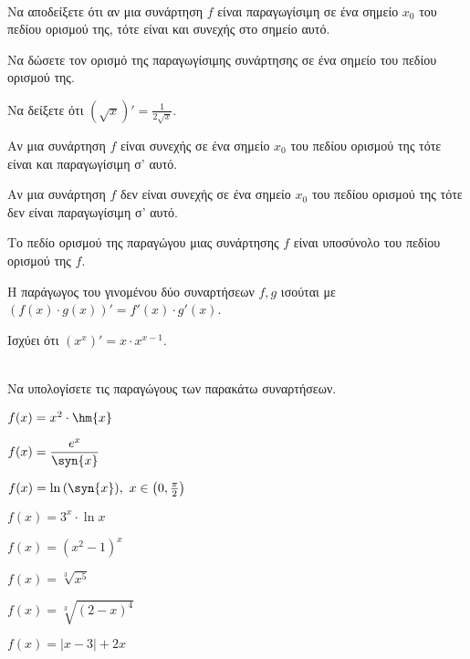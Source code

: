 \documentclass[ektypwsh]{frontisthrio-diag}
\begin{document}
\begin{thema}
\item\mbox{}\\
\vspace{-7mm}
\begin{erwthma}
\item Να αποδείξετε ότι αν μια συνάρτηση $ f $ είναι παραγωγίσιμη σε ένα σημείο $ x_0 $ του πεδίου ορισμού της, τότε είναι και συνεχής στο σημείο αυτό.
\item Να δώσετε τον ορισμό της παραγωγίσιμης συνάρτησης σε ένα σημείο του πεδίου ορισμού της.\\
\item Να δείξετε ότι $ (\sqrt{x})'=\frac{1}{2\sqrt{x}} $.
\item \swstolathospan
\begin{alist}
\item Αν μια συνάρτηση $ f $ είναι συνεχής σε ένα σημείο $ x_0 $ του πεδίου ορισμού της τότε είναι και παραγωγίσιμη σ' αυτό.
\item Αν μια συνάρτηση $ f $ δεν είναι συνεχής σε ένα σημείο $ x_0 $ του πεδίου ορισμού της τότε δεν είναι παραγωγίσιμη σ' αυτό.
\item Το πεδίο ορισμού της παραγώγου μιας συνάρτησης $ f $ είναι υποσύνολο του πεδίου ορισμού της $ f $.
\item Η παράγωγος του γινομένου δύο συναρτήσεων $ f,g $ ισούται με $ (f(x)\cdot g(x))'=f'(x)\cdot g'(x) $.
\item Ισχύει ότι $ \left(x^x\right)'=x\cdot x^{x-1} $.
\end{alist}
\end{erwthma}
\item\mbox{}\\
Να υπολογίσετε τις παραγώγους των παρακάτω συναρτήσεων.
\begin{multicols}{2}
\begin{erwthma}
\item $ f(x)=x^2\cdot\hm{x} $
\item $ f(x)=\dfrac{e^x}{\syn{x}} $
\item $ f(x)=\ln{(\syn{x})},\ x\in\left(0,\frac{\pi}{2} \right)  $
\item $ f(x)=3^x\cdot\ln{x} $
\item $ f(x)=(x^2-1)^x $
\item $ f(x)=\sqrt[3]{x^5} $
\item $ f(x)=\sqrt[3]{(2-x)^4}  $
\item $ f(x)=|x-3|+2x $

\end{erwthma}
\end{multicols}
\end{thema}
\end{document}
